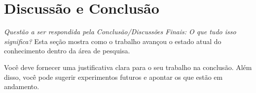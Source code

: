 \section{Discussão e Conclusão}

\emph{Questão a ser respondida pela Conclusão/Discussões Finais: O que tudo isso significa?}
Esta seção mostra como o trabalho avançou o estado atual do conhecimento dentro da área de pesquisa.

Você deve fornecer uma justificativa clara para o seu trabalho na conclusão.  Além disso, você pode sugerir experimentos futuros e apontar os que estão em andamento.
